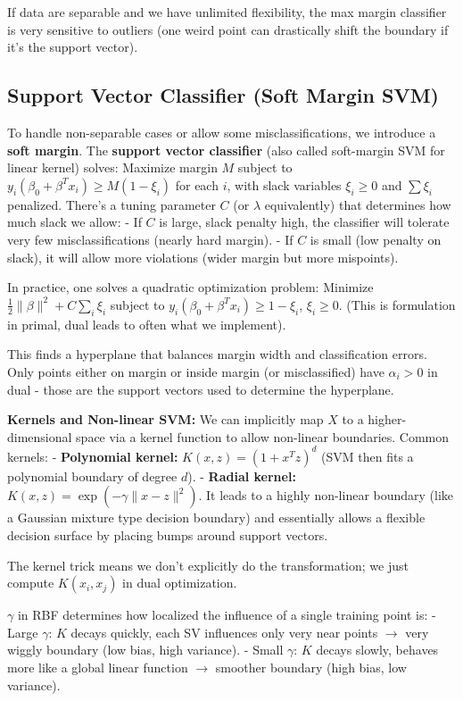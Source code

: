 \documentclass[11pt]{article}
\begin{document}
If data are separable and we have unlimited flexibility, the max margin classifier is very sensitive to outliers (one weird point can drastically shift the boundary if it's the support vector).

\subsection{Support Vector Classifier (Soft Margin SVM)}
To handle non-separable cases or allow some misclassifications, we introduce a \textbf{soft margin}. The \textbf{support vector classifier} (also called soft-margin SVM for linear kernel) solves:
Maximize margin $M$ subject to $y_i(\beta_0 + \beta^T x_i) \ge M(1 - \xi_i)$ for each $i$, with slack variables $\xi_i \ge 0$ and $\sum \xi_i$ penalized. There's a tuning parameter $C$ (or $\lambda$ equivalently) that determines how much slack we allow: 
- If $C$ is large, slack penalty high, the classifier will tolerate very few misclassifications (nearly hard margin).
- If $C$ is small (low penalty on slack), it will allow more violations (wider margin but more mispoints).

In practice, one solves a quadratic optimization problem:
Minimize $\frac{1}{2}\|\beta\|^2 + C \sum_i \xi_i$ subject to $y_i(\beta_0 + \beta^T x_i) \ge 1 - \xi_i$, $\xi_i \ge 0$. (This is formulation in primal, dual leads to often what we implement).

This finds a hyperplane that balances margin width and classification errors. Only points either on margin or inside margin (or misclassified) have $\alpha_i >0$ in dual - those are the support vectors used to determine the hyperplane.

\textbf{Kernels and Non-linear SVM:}
We can implicitly map $X$ to a higher-dimensional space via a kernel function to allow non-linear boundaries. Common kernels:
- \textbf{Polynomial kernel:} $K(x,z) = (1 + x^T z)^d$ (SVM then fits a polynomial boundary of degree $d$).
- \textbf{Radial kernel:} $K(x,z) = \exp(-\gamma \|x-z\|^2)$. It leads to a highly non-linear boundary (like a Gaussian mixture type decision boundary) and essentially allows a flexible decision surface by placing bumps around support vectors.

The kernel trick means we don’t explicitly do the transformation; we just compute $K(x_i, x_j)$ in dual optimization.

$\gamma$ in RBF determines how localized the influence of a single training point is:
- Large $\gamma$: $K$ decays quickly, each SV influences only very near points $\to$ very wiggly boundary (low bias, high variance).
- Small $\gamma$: $K$ decays slowly, behaves more like a global linear function $\to$ smoother boundary (high bias, low variance).
\end{document}
